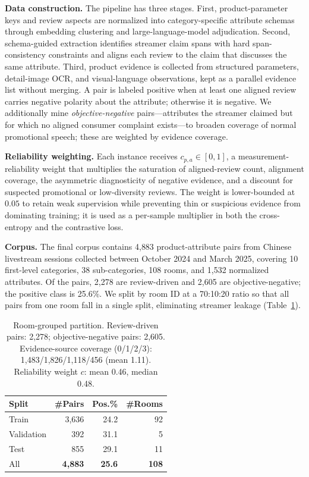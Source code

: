 \documentclass[letterpaper]{article}
\newcommand{\best}[1]{\textbf{#1}}
\begin{document}
\textbf{Data construction.} The pipeline has three stages. First, product-parameter keys and review aspects are normalized into category-specific attribute schemas through embedding clustering and large-language-model adjudication. Second, schema-guided extraction identifies streamer claim spans with hard span-consistency constraints and aligns each review to the claim that discusses the same attribute. Third, product evidence is collected from structured parameters, detail-image OCR, and visual-language observations, kept as a parallel evidence list without merging. A pair is labeled positive when at least one aligned review carries negative polarity about the attribute; otherwise it is negative. We additionally mine \emph{objective-negative} pairs---attributes the streamer claimed but for which no aligned consumer complaint exists---to broaden coverage of normal promotional speech; these are weighted by evidence coverage.

\textbf{Reliability weighting.} Each instance receives $c_{p,a}\in[0,1]$, a measurement-reliability weight that multiplies the saturation of aligned-review count, alignment coverage, the asymmetric diagnosticity of negative evidence, and a discount for suspected promotional or low-diversity reviews. The weight is lower-bounded at $0.05$ to retain weak supervision while preventing thin or suspicious evidence from dominating training; it is used as a per-sample multiplier in both the cross-entropy and the contrastive loss.

\textbf{Corpus.} The final corpus contains 4{,}883 product-attribute pairs from Chinese livestream sessions collected between October 2024 and March 2025, covering 10 first-level categories, 38 sub-categories, 108 rooms, and 1{,}532 normalized attributes. Of the pairs, 2{,}278 are review-driven and 2{,}605 are objective-negative; the positive class is 25.6\%. We split by room ID at a 70:10:20 ratio so that all pairs from one room fall in a single split, eliminating streamer leakage (Table~\ref{tab:data}).

\begin{table}[t]
\centering\small
\setlength{\tabcolsep}{8pt}
\begin{tabular}{lrrr}
\toprule
Split & \#Pairs & Pos.\% & \#Rooms \\
\midrule
Train & 3{,}636 & 24.2 & 92 \\
Validation & 392 & 31.1 & 5 \\
Test & 855 & 29.1 & 11 \\
\midrule
All & \best{4{,}883} & \best{25.6} & \best{108} \\
\bottomrule
\end{tabular}
\caption{Room-grouped partition. Review-driven pairs: 2{,}278; objective-negative pairs: 2{,}605. Evidence-source coverage (0/1/2/3): 1{,}483/1{,}826/1{,}118/456 (mean 1.11). Reliability weight $c$: mean 0.46, median 0.48.}
\label{tab:data}
\end{table}
\end{document}
